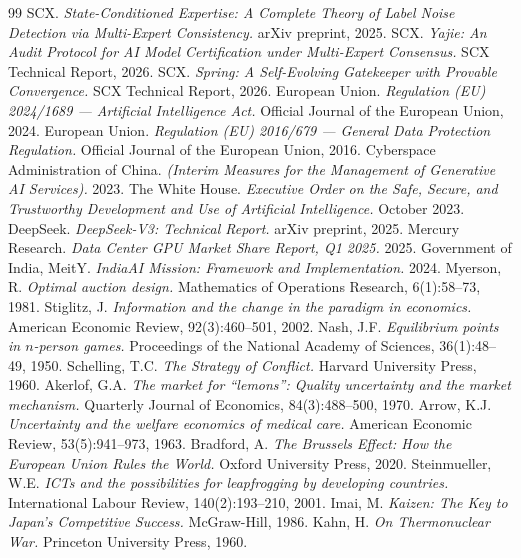 \documentclass[11pt,a4paper]{article}
\theoremstyle{definition}
\theoremstyle{remark}
\begin{document}
\begin{thebibliography}{99}
SCX.
\emph{State-Conditioned Expertise: A Complete Theory of Label Noise Detection via Multi-Expert Consistency.}
arXiv preprint, 2025.
SCX.
\emph{Yajie: An Audit Protocol for AI Model Certification under Multi-Expert Consensus.}
SCX Technical Report, 2026.
SCX.
\emph{Spring: A Self-Evolving Gatekeeper with Provable Convergence.}
SCX Technical Report, 2026.
European Union.
\emph{Regulation (EU) 2024/1689 --- Artificial Intelligence Act.}
Official Journal of the European Union, 2024.
European Union.
\emph{Regulation (EU) 2016/679 --- General Data Protection Regulation.}
Official Journal of the European Union, 2016.
Cyberspace Administration of China.
\emph{ (Interim Measures for the Management of Generative AI Services).}
2023.
The White House.
\emph{Executive Order on the Safe, Secure, and Trustworthy Development and Use of Artificial Intelligence.}
October 2023.
DeepSeek.
\emph{DeepSeek-V3: Technical Report.}
arXiv preprint, 2025.
Mercury Research.
\emph{Data Center GPU Market Share Report, Q1 2025.}
2025.
Government of India, MeitY.
\emph{IndiaAI Mission: Framework and Implementation.}
2024.
Myerson, R.
\emph{Optimal auction design.}
Mathematics of Operations Research, 6(1):58--73, 1981.
Stiglitz, J.
\emph{Information and the change in the paradigm in economics.}
American Economic Review, 92(3):460--501, 2002.
Nash, J.F.
\emph{Equilibrium points in $n$-person games.}
Proceedings of the National Academy of Sciences, 36(1):48--49, 1950.
Schelling, T.C.
\emph{The Strategy of Conflict.}
Harvard University Press, 1960.
Akerlof, G.A.
\emph{The market for ``lemons'': Quality uncertainty and the market mechanism.}
Quarterly Journal of Economics, 84(3):488--500, 1970.
Arrow, K.J.
\emph{Uncertainty and the welfare economics of medical care.}
American Economic Review, 53(5):941--973, 1963.
Bradford, A.
\emph{The Brussels Effect: How the European Union Rules the World.}
Oxford University Press, 2020.
Steinmueller, W.E.
\emph{ICTs and the possibilities for leapfrogging by developing countries.}
International Labour Review, 140(2):193--210, 2001.
Imai, M.
\emph{Kaizen: The Key to Japan's Competitive Success.}
McGraw-Hill, 1986.
Kahn, H.
\emph{On Thermonuclear War.}
Princeton University Press, 1960.
\end{thebibliography}
\end{document}
